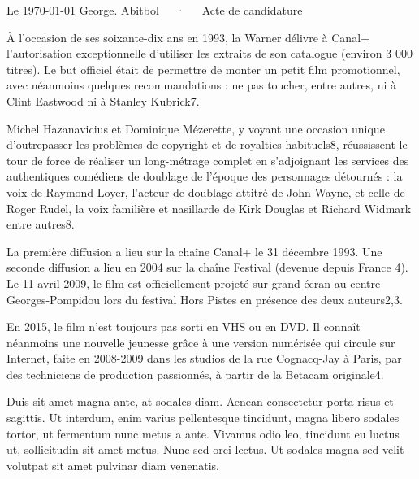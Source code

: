\documentclass[11pt, a4paper]{awesome-cv}
\begin{document}
\makecvheader[L]

\makecvfooter
  {Le \today}
  {George. Abitbol~~~·~~~Acte de candidature}
  {}

\makelettertitle

\begin{cvletter}

À l'occasion de ses soixante-dix ans en 1993, la Warner délivre à Canal+ l'autorisation exceptionnelle d'utiliser les extraits de son catalogue (environ 3 000 titres). Le but officiel était de permettre de monter un petit film promotionnel, avec néanmoins quelques recommandations : ne pas toucher, entre autres, ni à Clint Eastwood ni à Stanley Kubrick7.

Michel Hazanavicius et Dominique Mézerette, y voyant une occasion unique d'outrepasser les problèmes de copyright et de royalties habituels8, réussissent le tour de force de réaliser un long-métrage complet en s'adjoignant les services des authentiques comédiens de doublage de l'époque des personnages détournés : la voix de Raymond Loyer, l'acteur de doublage attitré de John Wayne, et celle de Roger Rudel, la voix familière et nasillarde de Kirk Douglas et Richard Widmark entre autres8. 

La première diffusion a lieu sur la chaîne Canal+ le 31 décembre 1993. Une seconde diffusion a lieu en 2004 sur la chaîne Festival (devenue depuis France 4). Le 11 avril 2009, le film est officiellement projeté sur grand écran au centre Georges-Pompidou lors du festival Hors Pistes en présence des deux auteurs2,3.

En 2015, le film n'est toujours pas sorti en VHS ou en DVD. Il connaît néanmoins une nouvelle jeunesse grâce à une version numérisée qui circule sur Internet, faite en 2008-2009 dans les studios de la rue Cognacq-Jay à Paris, par des techniciens de production passionnés, à partir de la Betacam originale4. 

Duis sit amet magna ante, at sodales diam. Aenean consectetur porta risus et sagittis. Ut interdum, enim varius pellentesque tincidunt, magna libero sodales tortor, ut fermentum nunc metus a ante. Vivamus odio leo, tincidunt eu luctus ut, sollicitudin sit amet metus. Nunc sed orci lectus. Ut sodales magna sed velit volutpat sit amet pulvinar diam venenatis.



\end{cvletter}


\makeletterclosing
\end{document}
